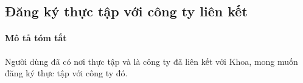 \documentclass[./../main.tex]{subfiles}
\begin{document}













\subsection{Đăng ký thực tập với công ty liên kết}

\paragraph*{Mô tả tóm tắt}

Người dùng đã có nơi thực tập và là công ty đã liên kết với Khoa, mong
muốn đăng ký thực tập với công ty đó.
\end{document}
